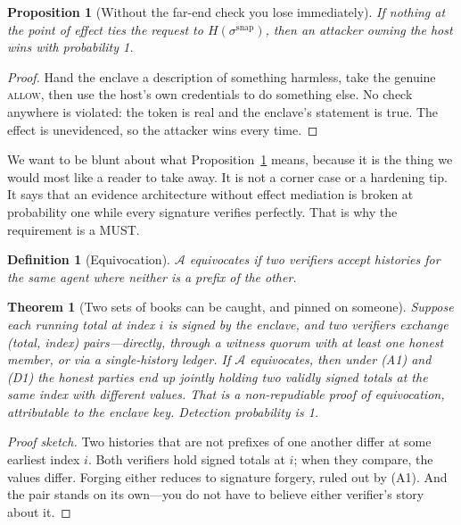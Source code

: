 \documentclass[11pt]{article}
\newtheorem{definition}{Definition}
\newtheorem{theorem}{Theorem}
\newtheorem{proposition}{Proposition}
\begin{document}
\begin{proposition}[Without the far-end check you lose immediately]
\label{prop:necessity}
If nothing at the point of effect ties the request to
$H(\sigma^{\mathrm{snap}})$, then an attacker owning the host wins with
probability 1.
\end{proposition}
\begin{proof}
Hand the enclave a description of something harmless, take the genuine
\textsc{allow}, then use the host's own credentials to do something else.
No check anywhere is violated: the token is real and the enclave's statement
is true. The effect is unevidenced, so the attacker wins every time. \end{proof}

We want to be blunt about what Proposition~\ref{prop:necessity} means, because
it is the thing we would most like a reader to take away. It is not a corner
case or a hardening tip. It says that an evidence architecture without effect
mediation is broken at probability one while every signature verifies
perfectly. That is why the requirement is a MUST.

\begin{definition}[Equivocation]
$\mathcal{A}$ equivocates if two verifiers accept histories for the same agent
where neither is a prefix of the other.
\end{definition}

\begin{theorem}[Two sets of books can be caught, and pinned on someone]
\label{thm:equiv}
Suppose each running total at index $i$ is signed by the enclave, and two
verifiers exchange (total, index) pairs---directly, through a witness quorum
with at least one honest member, or via a single-history ledger. If
$\mathcal{A}$ equivocates, then under (A1) and (D1) the honest parties end up
jointly holding two validly signed totals at the same index with different
values. That is a non-repudiable proof of equivocation, attributable to the
enclave key. Detection probability is 1.
\end{theorem}

\begin{proof}[Proof sketch]
Two histories that are not prefixes of one another differ at some earliest
index $i$. Both verifiers hold signed totals at $i$; when they compare, the
values differ. Forging either reduces to signature forgery, ruled out by (A1).
And the pair stands on its own---you do not have to believe either verifier's
story about it. \end{proof}
\end{document}
